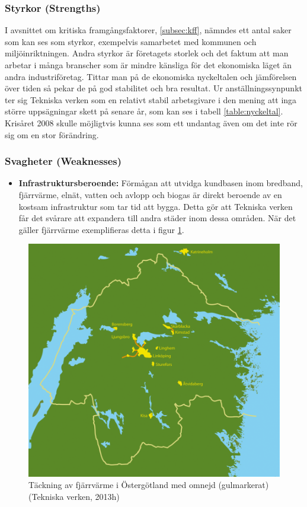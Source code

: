 \documentclass[10pt,a4paper]{article}
\begin{document}
\subsubsection{Styrkor (Strengths)}
I avsnittet om kritiska framgångsfaktorer, \ref{subsec:kff}, nämndes ett antal
saker som kan ses som styrkor, exempelvis samarbetet med kommunen och
miljöinriktningen. Andra styrkor är företagets storlek och det
faktum att man arbetar i många branscher som är mindre känsliga för det
ekonomiska läget än andra industriföretag. Tittar man på de ekonomiska
nyckeltalen och jämförelsen över tiden så pekar de på god stabilitet och bra
resultat. Ur anställningssynpunkt ter sig Tekniska verken som en relativt 
stabil arbetsgivare i den mening att inga större uppsägningar skett på senare
år, som kan ses i tabell \ref{table:nyckeltal}. Krisåret 2008 skulle möjligtvis
kunna ses som ett undantag även om det inte rör sig om en stor förändring.

\subsubsection{Svagheter (Weaknesses)}
\begin{itemize}
	\item \textbf{Infrastruktursberoende:}
		Förmågan att utvidga kundbasen inom bredband, fjärrvärme, elnät, vatten och avlopp och biogas är direkt beroende av en kostsam infrastruktur som tar tid att bygga. Detta gör att Tekniska verken får det svårare att expandera till andra städer inom dessa områden. När det gäller fjärrvärme exemplifieras detta i figur \ref{fig:fjarr}.
		
\end{itemize}
\begin{figure}[H] 
\centerline{\includegraphics[scale=0.5]{Bilder/teckning_fjarrvarme.png}}
\caption{Täckning av fjärrvärme i Östergötland med omnejd (gulmarkerat) (Tekniska verken, 2013h)}
\label{fig:fjarr}
\end{figure}  
\end{document}
